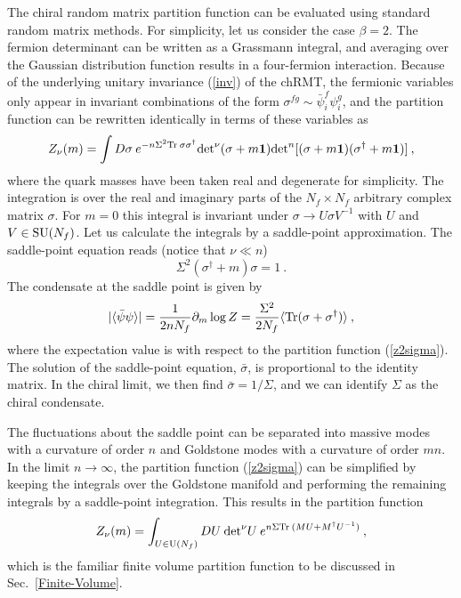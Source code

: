 The chiral random matrix partition function can be evaluated using
standard random matrix methods. For simplicity, let us consider the
case $\beta=2$.  The fermion determinant can be written as a Grassmann
integral, and averaging over the Gaussian distribution function
results in a four-fermion interaction. Because of the underlying
unitary invariance (\ref{inv}) of the chRMT, the
fermionic variables only appear in invariant combinations of the form
$\sigma^{fg} \sim \bar\psi^f_i \psi^g_i$, and the partition function
can be rewritten identically in terms of these variables as
\cite{Shur93,HVeff}
\begin{equation}
  Z_{\nu}(m) = \int D \sigma \: e^{-{n\Sigma^2} {\rm Tr\:}
  \sigma \sigma^\dagger}{\det}^{\nu} (\sigma+m{\bf 1} ){\det}^{n}
  [(\sigma+m{\bf 1} )(\sigma^\dagger +m{\bf 1})]\:,
  \label{z2sigma}
\end{equation}
where the quark masses have been taken real and degenerate for
simplicity.  The integration is over the real and imaginary parts of
the $N_f \times N_f$ arbitrary complex matrix $\sigma$. For $m = 0$
this integral is invariant under $\sigma \rightarrow U \sigma V^{-1}$
with $U$ and $V\in{\rm SU}(N_f)$.  Let us calculate the integrals by a
saddle-point approximation.  The saddle-point equation reads (notice
that $\nu \ll n$)
\begin{equation}
  \Sigma^2 (\sigma^\dagger+m) \sigma = 1\:.
\end{equation}
The condensate at the saddle point is given by
\begin{equation}
  |\langle\bar\psi\psi\rangle| = \frac 1{2nN_f} \partial_m \log Z = 
  \frac {\Sigma^2}{2N_f}\langle {\rm Tr}(\sigma +\sigma^\dagger)\rangle \:,
\end{equation}
where the expectation value is with respect to the partition function
(\ref{z2sigma}).  The solution of the saddle-point equation,
$\bar\sigma$, is proportional to the identity matrix.  In the chiral
limit, we then find $\bar \sigma = 1/\Sigma$, and we can identify
$\Sigma$ as the chiral condensate.

The fluctuations about the saddle point can be separated into massive
modes with a curvature of order $n$ and Goldstone modes with a
curvature of order $mn$.  In the limit $n\rightarrow \infty$, the
partition function (\ref{z2sigma}) can be simplified by keeping the
integrals over the Goldstone manifold and performing the remaining
integrals by a saddle-point integration. This results in the partition
function
\begin{equation}
  \label{Znum}
  Z_{\nu}( m) = \int_{U \in {\rm U}(N_f)} DU\: {\det}^\nu U\:
  e^{ n\Sigma  {\rm Tr\:} (MU + M^\dagger U^{-1})}\:,
\end{equation}
which is the familiar finite volume partition function to be discussed
in Sec.~\ref{Finite-Volume}.

